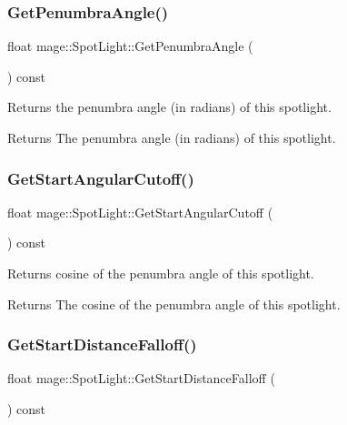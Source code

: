 \subsubsection{\texorpdfstring{Get\+Penumbra\+Angle()}{GetPenumbraAngle()}}
{\footnotesize\ttfamily float mage\+::\+Spot\+Light\+::\+Get\+Penumbra\+Angle (\begin{DoxyParamCaption}{ }\end{DoxyParamCaption}) const\hspace{0.3cm}{\ttfamily [noexcept]}}

Returns the penumbra angle (in radians) of this spotlight.

\begin{DoxyReturn}{Returns}
The penumbra angle (in radians) of this spotlight. 
\end{DoxyReturn}
\hypertarget{classmage_1_1_spot_light_ae221dd2747e65d01fcbf2a9b08c54abd}{}\label{classmage_1_1_spot_light_ae221dd2747e65d01fcbf2a9b08c54abd} 
\subsubsection{\texorpdfstring{Get\+Start\+Angular\+Cutoff()}{GetStartAngularCutoff()}}
{\footnotesize\ttfamily float mage\+::\+Spot\+Light\+::\+Get\+Start\+Angular\+Cutoff (\begin{DoxyParamCaption}{ }\end{DoxyParamCaption}) const\hspace{0.3cm}{\ttfamily [noexcept]}}

Returns cosine of the penumbra angle of this spotlight.

\begin{DoxyReturn}{Returns}
The cosine of the penumbra angle of this spotlight. 
\end{DoxyReturn}
\hypertarget{classmage_1_1_spot_light_a98a5da32f0023d8f0d600fe3f362decd}{}\label{classmage_1_1_spot_light_a98a5da32f0023d8f0d600fe3f362decd} 
\subsubsection{\texorpdfstring{Get\+Start\+Distance\+Falloff()}{GetStartDistanceFalloff()}}
{\footnotesize\ttfamily float mage\+::\+Spot\+Light\+::\+Get\+Start\+Distance\+Falloff (\begin{DoxyParamCaption}{ }\end{DoxyParamCaption}) const\hspace{0.3cm}{\ttfamily [noexcept]}}

